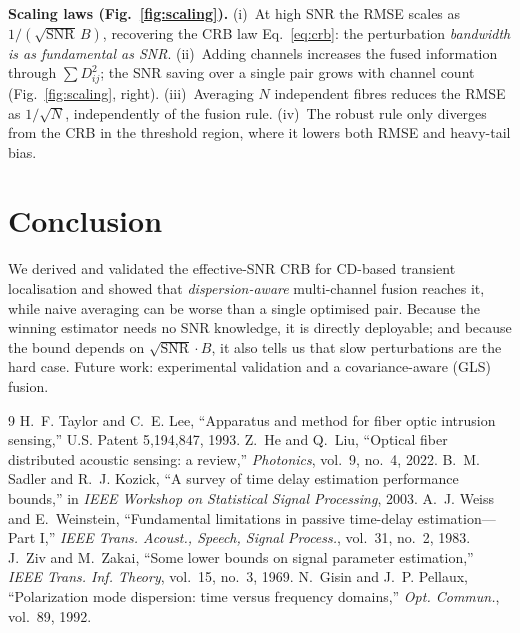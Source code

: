 \documentclass[10pt]{article}
\newcommand{\SNR}{\mathrm{SNR}}
\begin{document}
\noindent\textbf{Scaling laws (Fig.~\ref{fig:scaling}).} (i)~At high SNR the
RMSE scales as $1/(\sqrt{\SNR}\,B)$, recovering the CRB law
Eq.~\eqref{eq:crb}: the perturbation \emph{bandwidth is as fundamental as SNR}.
(ii)~Adding channels increases the fused information through $\sum D_{ij}^2$;
the SNR saving over a single pair grows with channel count (Fig.~\ref{fig:scaling},
right). (iii)~Averaging $N$ independent fibres reduces the RMSE as
$1/\sqrt{N}$, independently of the fusion rule. (iv)~The robust rule only
diverges from the CRB in the threshold region, where it lowers both RMSE and
heavy-tail bias.

\section{Conclusion}
\label{sec:conclusion}
We derived and validated the effective-SNR CRB for CD-based transient
localisation and showed that \emph{dispersion-aware} multi-channel fusion
reaches it, while naive averaging can be worse than a single optimised pair.
Because the winning estimator needs no SNR knowledge, it is directly
deployable; and because the bound depends on $\sqrt{\SNR}\cdot B$, it also tells
us that slow perturbations are the hard case. Future work: experimental
validation and a covariance-aware (GLS) fusion.

\begin{thebibliography}{9}\small
{} H.~F. Taylor and C.~E. Lee, ``Apparatus and method for
fiber optic intrusion sensing,'' U.S. Patent 5,194,847, 1993.
 Z.~He and Q.~Liu, ``Optical fiber distributed acoustic
sensing: a review,'' \emph{Photonics}, vol.~9, no.~4, 2022.
 B.~M. Sadler and R.~J. Kozick, ``A survey of time
delay estimation performance bounds,'' in \emph{IEEE Workshop on Statistical
Signal Processing}, 2003.
 A.~J. Weiss and E.~Weinstein, ``Fundamental limitations in
passive time-delay estimation---Part I,'' \emph{IEEE Trans. Acoust., Speech,
Signal Process.}, vol.~31, no.~2, 1983.
 J.~Ziv and M.~Zakai, ``Some lower bounds on signal parameter
estimation,'' \emph{IEEE Trans. Inf. Theory}, vol.~15, no.~3, 1969.
 N.~Gisin and J.~P. Pellaux, ``Polarization mode dispersion:
time versus frequency domains,'' \emph{Opt. Commun.}, vol.~89, 1992.
\end{thebibliography}
\end{document}
